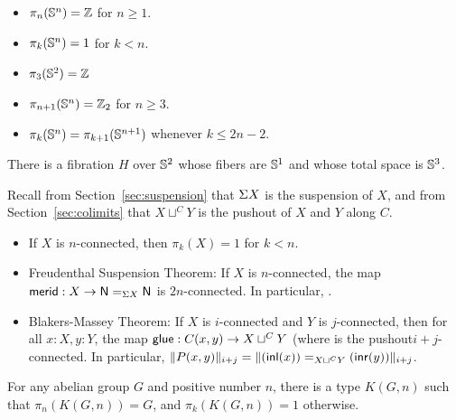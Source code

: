 \begin{thm} \mbox{}
\begin{itemize}
\item $\pi_n(\Sn ^n) = \mathbb{Z}$ for $n \ge 1$.
\item $\pi_k(\Sn ^n) = 1$ for $k < n$.  
\item $\pi_3(\Sn ^2) = \mathbb{Z}$
\item $\pi_{n+1}(\Sn ^n) = \mathbb{Z}_2$ for $n \ge 3$.    
\item $\pi_k(\Sn ^n) = \pi_{k+1}(\Sn ^{n+1})$ whenever $k \le 2n - 2$.  
\end{itemize}
\end{thm}

\begin{thm}
There is a fibration $H$ over $\Sn ^2$ whose fibers are $\Sn ^1$ and
whose total space is $\Sn ^3$.  
\end{thm}

\begin{thm} \mbox{}
Recall from Section~\ref{sec:suspension} that $\susp X$ is the
suspension of $X$, and from Section~\ref{sec:colimits} that $X \sqcup^C
Y$ is the pushout of $X$ and $Y$ along $C$.

\begin{itemize}
\item If $X$ is $n$-connected, then $\pi_k(X) = 1$ for $k < n$.  

\item Freudenthal Suspension Theorem: 
  If $X$ is $n$-connected, the map $\merid : X \rightarrow \id[\susp X]
  \north \north$ is $2n$-connected.  In particular,
  .

\item Blakers-Massey Theorem: If $X$ is $i$-connected and $Y$ is
  $j$-connected, then for all $x:X,y:Y$, the map $\glue : C(x,y)
  \rightarrow X \sqcup^C Y$ (where is the pushout$i+j$-connected.  In
  particular, $\trunc {i+j} {P(x,y)} = \trunc {i+j} {\id [X \sqcup^C Y]
    {(\inl(x))} {(\inr(y))}}$.
\end{itemize}
\end{thm}

\begin{thm}
For any abelian group $G$ and positive number $n$, there is a type
$K(G,n)$ such that $\pi_n(K(G,n)) = G$, and  $\pi_k(K(G,n)) = 1$
otherwise.  
\end{thm}

